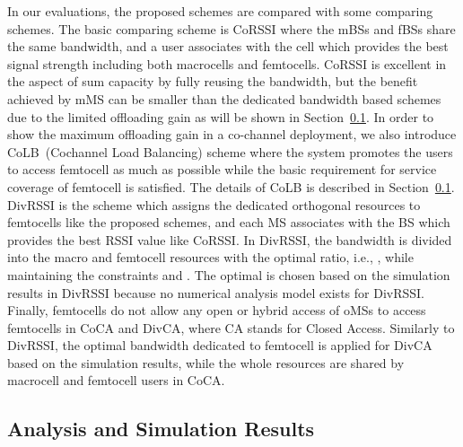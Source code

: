 \documentclass[journal]{IEEEtran}
\begin{document}
In our evaluations, the proposed schemes are compared with some comparing schemes.
The basic comparing scheme is CoRSSI where the mBSs and fBSs share the
same bandwidth, and a user associates with the cell which  provides the best signal strength
including both macrocells and femtocells.
CoRSSI is excellent in the aspect of sum capacity by fully reusing the
bandwidth, but the benefit achieved by
mMS can be smaller than the dedicated bandwidth based schemes
due to the limited offloading gain as will be shown in
Section~\ref{sec:simulations}.
In order to show the maximum offloading gain in a co-channel deployment, we also introduce CoLB~(Cochannel Load Balancing) scheme where
the system promotes the users to access femtocell as much as possible
while the basic requirement for service coverage
of femtocell is satisfied. The details of CoLB is described in Section~\ref{sec:simulations}.
DivRSSI is the scheme which assigns the dedicated orthogonal resources to femtocells like the proposed schemes, and each MS associates with the BS which provides the best RSSI value like CoRSSI. In DivRSSI,
the bandwidth is divided into the macro and femtocell resources with
the optimal ratio, i.e., , while maintaining the constraints  and .
The optimal  is chosen based on the simulation results
in DivRSSI because no numerical analysis model exists for DivRSSI.
Finally, femtocells do not allow any open or hybrid access of oMSs
to access femtocells in CoCA and DivCA, where CA stands for Closed Access.
Similarly to DivRSSI, the optimal bandwidth dedicated to femtocell is applied
for DivCA based on the simulation results, while the whole
resources are shared by macrocell and femtocell users in CoCA.

\subsection{Analysis and Simulation Results}
\label{sec:simulations}
\end{document}
